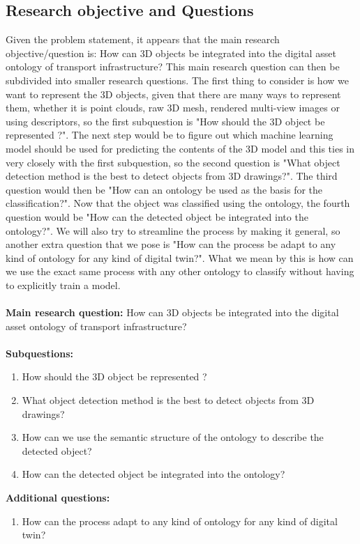 \documentclass[a4paper,11pt,oneside]{article}
\begin{document}
  \subsection{Research objective and Questions}
  Given the problem statement, it appears that the main research objective/question is: How can 3D objects be integrated into the digital asset ontology of transport infrastructure? This main research question can then be subdivided into smaller research questions. The first thing to consider is how we want to represent the 3D objects, given that there are many ways to represent them, whether it is point clouds, raw 3D mesh, rendered multi-view images or using descriptors, so the first subquestion is "How should the 3D object be represented ?". The next step would be to figure out which machine learning model should be used for predicting the contents of the 3D model and this ties in very closely with the first subquestion, so the second question is "What object detection method is the best to detect objects from 3D drawings?". The third question would then be "How can an ontology be used as the basis for the classification?". Now that the object was classified using the ontology, the fourth question would be "How can the detected object be integrated into the ontology?". We will also try to streamline the process by making it general, so another extra question that we pose is "How can the process be adapt to any kind of ontology for any kind of digital twin?". What we mean by this is how can we use the exact same process with any other ontology to classify without having to explicitly train a model.\\ \\
  \textbf{Main research question:} How can 3D objects be integrated into the digital asset ontology of transport infrastructure? \\ \\
  \textbf{Subquestions:}
  	\begin{enumerate}
  		\item How should the 3D object be represented ?
  		\item What object detection method is the best to detect objects from 3D drawings?
  		\item How can we use the semantic structure of the ontology to describe the detected object?
  		\item How can the detected object be integrated into the ontology?
	\end{enumerate}
  \textbf{Additional questions:}
  	\begin{enumerate}
  		\item How can the process adapt to any kind of ontology for any kind of digital twin?
	\end{enumerate}
  
\end{document}
